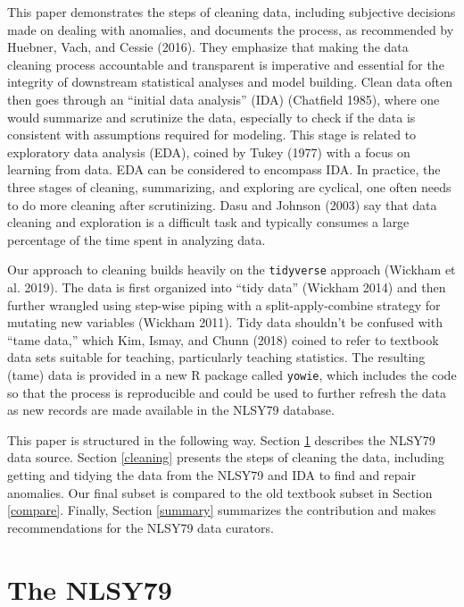 \documentclass{article}
\begin{document}
This paper demonstrates the steps of cleaning data, including subjective decisions made on dealing with anomalies, and documents the process, as recommended by Huebner, Vach, and Cessie (2016). They emphasize that making the data cleaning process accountable and transparent is imperative and essential for the integrity of downstream statistical analyses and model building. Clean data often then goes through an ``initial data analysis'' (IDA) (Chatfield 1985), where one would summarize and scrutinize the data, especially to check if the data is consistent with assumptions required for modeling. This stage is related to exploratory data analysis (EDA), coined by Tukey (1977) with a focus on learning from data. EDA can be considered to encompass IDA. In practice, the three stages of cleaning, summarizing, and exploring are cyclical, one often needs to do more cleaning after scrutinizing. Dasu and Johnson (2003) say that data cleaning and exploration is a difficult task and typically consumes a large percentage of the time spent in analyzing data.

Our approach to cleaning builds heavily on the \texttt{tidyverse} approach (Wickham et al. 2019). The data is first organized into ``tidy data'' (Wickham 2014) and then further wrangled using step-wise piping with a split-apply-combine strategy for mutating new variables (Wickham 2011). Tidy data shouldn't be confused with ``tame data,'' which Kim, Ismay, and Chunn (2018) coined to refer to textbook data sets suitable for teaching, particularly teaching statistics. The resulting (tame) data is provided in a new R package called \texttt{yowie}, which includes the code so that the process is reproducible and could be used to further refresh the data as new records are made available in the NLSY79 database.

This paper is structured in the following way. Section \ref{database} describes the NLSY79 data source. Section \ref{cleaning} presents the steps of cleaning the data, including getting and tidying the data from the NLSY79 and IDA to find and repair anomalies. Our final subset is compared to the old textbook subset in Section \ref{compare}. Finally, Section \ref{summary} summarizes the contribution and makes recommendations for the NLSY79 data curators.

\hypertarget{database}{%
\section{The NLSY79}\label{database}}
\end{document}
